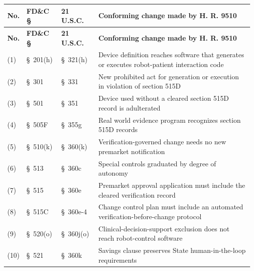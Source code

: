 {\footnotesize
\begin{xltabular}{\textwidth}{@{}L{1.0cm} L{1.6cm} L{1.7cm} Y@{}}
\hline
\textbf{No.} & \textbf{FD\&C \S} & \textbf{21 U.S.C.} & \textbf{Conforming change
made by H. R. 9510}\\
\hline
\endfirsthead
\hline
\textbf{No.} & \textbf{FD\&C \S} & \textbf{21 U.S.C.} & \textbf{Conforming change
made by H. R. 9510}\\
\hline
\endhead
\hline
\endlastfoot
(1) & \S~201(h) & \S~321(h) & Device definition reaches software that generates or
executes robot-patient interaction code\\
\hline
(2) & \S~301 & \S~331 & New prohibited act for generation or execution in
violation of section 515D\\
\hline
(3) & \S~501 & \S~351 & Device used without a cleared section 515D record is
adulterated\\
\hline
(4) & \S~505F & \S~355g & Real world evidence program recognizes section 515D
records\\
\hline
(5) & \S~510(k) & \S~360(k) & Verification-governed change needs no new premarket
notification\\
\hline
(6) & \S~513 & \S~360c & Special controls graduated by degree of autonomy\\
\hline
(7) & \S~515 & \S~360e & Premarket approval application must include the cleared
verification record\\
\hline
(8) & \S~515C & \S~360e-4 & Change control plan must include an automated
verification-before-change protocol\\
\hline
(9) & \S~520(o) & \S~360j(o) & Clinical-decision-support exclusion does not reach
robot-control software\\
\hline
(10) & \S~521 & \S~360k & Savings clause preserves State human-in-the-loop
requirements\\
\hline
\end{xltabular}}


